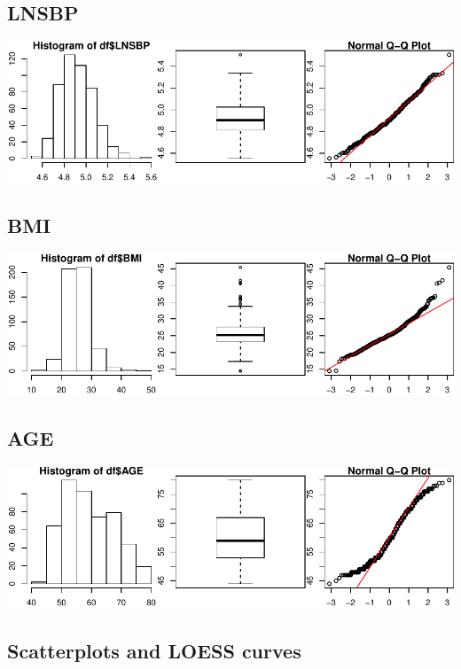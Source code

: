 \documentclass{article}
\begin{document}
\subsection*{LNSBP}
\begin{center}
\includegraphics{ass1-003}
\end{center}

\subsection*{BMI}
\begin{center}
\includegraphics{ass1-004}
\end{center}


\subsection*{AGE}
\begin{center}
\includegraphics{ass1-005}
\end{center}


\begin{center}
\section*{Scatterplots and LOESS curves}
\end{center}
\end{document}
